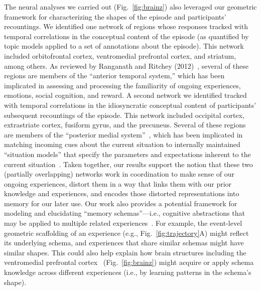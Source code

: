 \documentclass[10pt]{article}
\begin{document}
The neural analyses we carried out (Fig.~\ref{fig:brainz}) also leveraged our geometric framework for characterizing the shapes of the episode and participants' recountings.  We identified one network of regions whose responses tracked with temporal correlations in the conceptual content of the episode (as quantified by topic models applied to a set of annotations about the episode).  This network included orbitofrontal cortex, ventromedial prefrontal cortex, and striatum, among others.  As reviewed by Ranganath and Ritchey (2012)~\cite{RangRitc12}, several of these regions are members of the ``anterior temporal system,'' which has been implicated in assessing and processing the familiarity of ongoing experiences, emotions, social cognition, and reward.  A second network we identified tracked with temporal correlations in the idiosyncratic conceptual content of participants' subsequent recountings of the episode.  This network included occipital cortex, extrastriate cortex, fusiform gyrus, and the precuneus.  Several of these regions are members of the ``posterior medial system''~\citep{RangRitc12}, which has been implicated in matching incoming cues about the current situation to internally maintained ``situation models'' that specify the parameters and expectations inherent to the current situation~\citep{ZackEtal07, ZwaaRadv98}.  Taken together, our results support the notion that these two (partially overlapping) networks work in coordination to make sense of our ongoing experiences, distort them in a way that links them with our prior knowledge and experiences, and encodes those distorted representations into memory for our later use.  Our work also provides a potential framework for modeling and elucidating ``memory schemas''---i.e., cognitive abstractions that may be applied to multiple related experiences~\citep{GilbMarl17, BaldEtal18}.  For example, the event-level geometric scaffolding of an experience (e.g., Fig.~\ref{fig:trajectory}A) might reflect its underlying schema, and experiences that share similar schemas might have similar shapes.  This could also help explain how brain structures including the ventromedial prefrontal cortex~\citep{GilbMarl17} (Fig.~\ref{fig:brainz}) might acquire or apply schema knowledge across different experiences (i.e., by learning patterns in the schema's shape).
\end{document}
